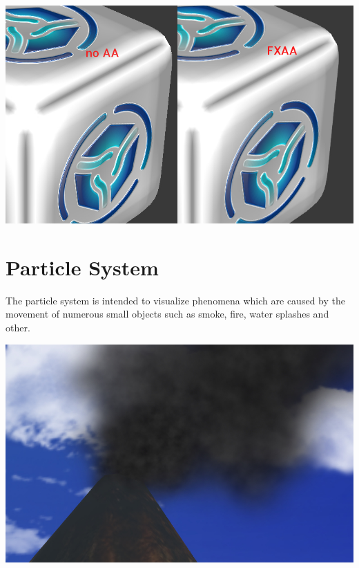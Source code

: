 \documentclass[a4paper,12pt,oneside]{sphinxmanual}
\begin{document}
{\hfill\includegraphics[width=1.000\linewidth]{antialiasing.jpg}\hfill}

\begin{DUlineblock}{0em}
\item[] 
\end{DUlineblock}
\label{particles:particles}

\chapter{Particle System}
\label{particles:index-0}\label{particles::doc}\label{particles:id1}
The particle system is intended to visualize phenomena which are caused by the movement of numerous small objects such as smoke, fire, water splashes and other.

{\hfill\includegraphics[width=1.000\linewidth]{particles_smoke.jpg}\hfill}

\begin{DUlineblock}{0em}
\item[] 
\end{DUlineblock}
\end{document}
